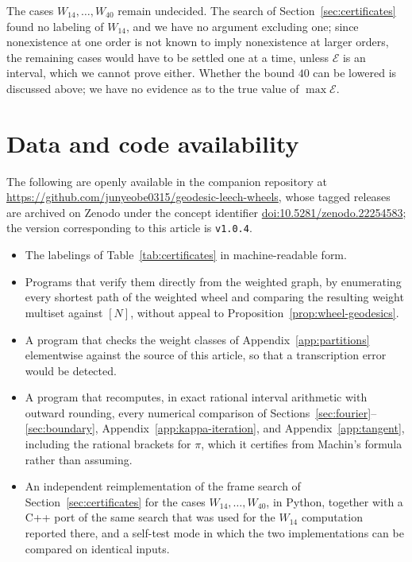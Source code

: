 \documentclass[11pt]{article}
\theoremstyle{definition}
\theoremstyle{remark}
\numberwithin{equation}{section}
\newcommand{\calE}{\mathcal{E}}
\begin{document}
The cases $W_{14},\ldots,W_{40}$ remain undecided. The search of
Section~\ref{sec:certificates} found no labeling of $W_{14}$, and we have no
argument excluding one; since nonexistence at one order is not known to imply
nonexistence at larger orders, the remaining cases would have to be settled one
at a time, unless $\calE$ is an interval, which we cannot prove either. Whether
the bound $40$ can be lowered is discussed above; we have no evidence as to the
true value of $\max\calE$.

\section*{Data and code availability}

The following are openly available in the companion repository at
\url{https://github.com/junyeobe0315/geodesic-leech-wheels}, whose tagged
releases are archived on Zenodo under the concept identifier
\href{https://doi.org/10.5281/zenodo.22254583}{doi:10.5281/zenodo.22254583};
the version corresponding to this article is \texttt{v1.0.4}.
\begin{itemize}[leftmargin=*]
\item The labelings of Table~\ref{tab:certificates} in machine-readable form.
\item Programs that verify them directly from the weighted graph, by enumerating
every shortest path of the weighted wheel and comparing the resulting weight
multiset against $[N]$, without appeal to
Proposition~\ref{prop:wheel-geodesics}.
\item A program that checks the weight classes of Appendix~\ref{app:partitions}
elementwise against the source of this article, so that a transcription error
would be detected.
\item A program that recomputes, in exact rational interval arithmetic with
outward rounding, every numerical comparison of
Sections~\ref{sec:fourier}--\ref{sec:boundary},
Appendix~\ref{app:kappa-iteration}, and Appendix~\ref{app:tangent}, including
the rational brackets for $\pi$, which it certifies from Machin's formula rather
than assuming.
\item An independent reimplementation of the frame search of
Section~\ref{sec:certificates} for the cases $W_{14},\ldots,W_{40}$, in
Python, together with a C++ port of the same search that was used for the
$W_{14}$ computation reported there, and a self-test mode in which the two
implementations can be compared on identical inputs.
\end{itemize}
\end{document}
